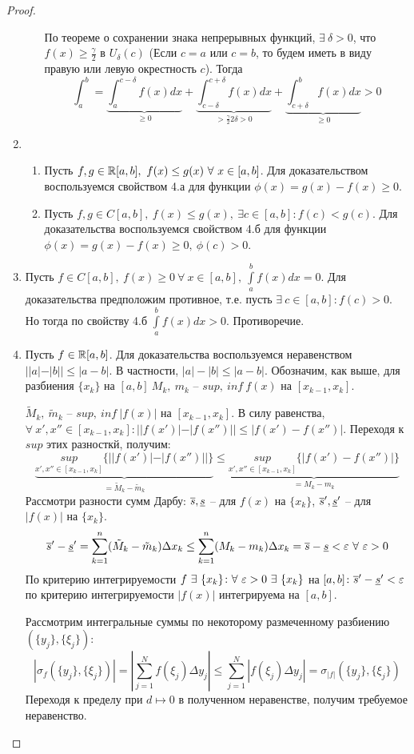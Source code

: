 \begin{proof}
\begin{enumerate}
\begin{enumerate}
По теореме о сохранении знака непрерывных функций, $\exists\ \delta>0$, что $f(x)\geq\frac\gamma2$ в $U_\delta(c)$ (Если $c=a$ или $c=b$, то будем иметь в виду правую или левую окрестность $c$). Тогда
$$
\int_a^b=\underset{\geq0}{\underbrace{\int_a^{c-\delta}f(x)dx}}+\underset{>\frac\gamma22\delta>0}{\underbrace{\int_{c-\delta}^{c+\delta}f(x)dx}}+\underset{\geq0}{\underbrace{\int^b_{c+\delta}f(x)dx}}>0
$$
\end{enumerate}
\item
\begin{enumerate}
\item Пусть $f,g\in\R[a,b],\ f(x)\leq g(x)\ \forall\ x\in[a,b]$. Для доказательством воспользуемся свойством 4.а для функции $\phi(x)=g(x)-f(x)\geq0$.
\item Пусть $f,g\in C[a,b],\ f(x)\leq g(x),\ \exists c\in[a,b]\colon f(c)<g(c)$. Для доказательства воспользуемся свойством 4.б для функции $\phi(x)=g(x)-f(x)\geq0,\ \phi(c)>0$.
\end{enumerate}
\item Пусть $f\in C[a,b],\ f(x)\geq0\ \forall\ x\in[a,b],\ \int\limits^b_af(x)dx=0$. Для доказательства предположим противное, т.е. пусть $\exists\ c\in[a,b]\colon f(c)>0$. Но тогда по свойству 4.б $\int\limits^b_af(x)dx>0$. Противоречие.
\item Пусть $f\in\mathbb{R}[a,b]$. Для доказательства воспользуемся неравенством $||a|-|b||\leq|a-b|$. В частности, $|a|-|b|\leq|a-b|$. Обозначим, как выше, для разбиения $\{x_k\}$ на $[a,b]\ M_k,\ m_k$ -- $sup,\ inf\ f(x)$ на $[x_{k-1},x_k]$.

$\tilde{M}_k,\ \tilde{m}_k$ -- $sup,\ inf\ |f(x)|$ на $[x_{k-1},x_k]$. В силу равенства, $\forall\ x',x''\in[x_{k-1},x_k]\colon||f(x')|-|f(x'')||\leq|f(x')-f(x'')|$. Переходя к $sup$ этих разносткй, получим:
$$
\underset{=\tilde{M}_k-\tilde{m}_k}{\underbrace{\underset{x',x''\in[x_{k-1},x_k]}{sup}\{||f(x')|-|f(x'')||\}}}\leq \underset{=M_k-m_k}{\underbrace{\underset{x',x''\in[x_{k-1},x_k]}{sup}\{|f(x')-f(x'')|\}}}
$$
Рассмотри разности сумм Дарбу: $\overline{s},\underline{s}$ -- для $f(x)$ на $\{x_k\}$, $\overline{s}',\underline{s}'$ -- для $|f(x)|$ на $\{x_k\}$.
$$
\vs'-\ns'=\sum^n_{k=1}(\tilde{M}_k-\tilde{m}_k)\Delta x_k\leq\sum^n_{k=1}(M_k-m_k)\Delta x_k=\vs-\ns<\eps\ \forall\ \eps>0
$$
По критерию интегрируемости $f\ \exists\ \{x_k\}\colon\forall\ \eps>0\ \exists\ \{x_k\}$ на $[a,b]\colon\overline{s}'-\underline{s}'<\varepsilon$ \then по критерию интегрируемости $|f(x)|$ интегрируема на $[a,b]$.

Рассмотрим интегральные суммы по некоторому размеченному разбиению $(\{y_j\},\{\xi_j\})$:
$$
|\sigma_f(\{y_j\},\{\xi_j\})|=|\sum^N_{j=1}f(\xi_j)\Delta y_j|\leq\sum^N_{j=1}|f(\xi_j)\Delta y_j|=\sigma_{|f|}(\{y_j\},\{\xi_j\})
$$
Переходя к пределу при $d\mapsto0$ в полученном неравенстве, получим требуемое неравенство.
\end{enumerate}
\end{proof}
